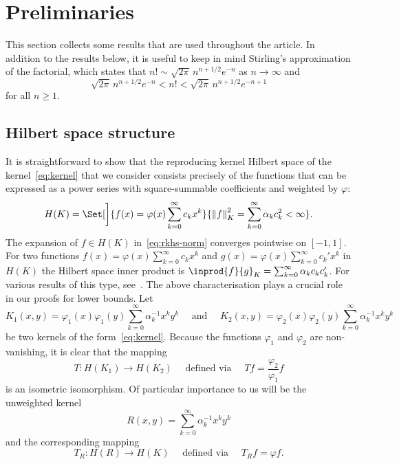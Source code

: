 \documentclass{mcom-l}
\numberwithin{equation}{section}
\numberwithin{theorem}{section} %
\begin{document}
\section{Preliminaries}

This section collects some results that are used throughout the article.
In addition to the results below, it is useful to keep in mind Stirling's approximation of the factorial, which states that $n! \sim \sqrt{2\pi} \, n^{n+1/2} e^{-n}$ as $n \to \infty$ and
\begin{equation*}
  \sqrt{2\pi} \, n^{n+1/2} e^{-n} < n! < \sqrt{2\pi} \, n^{n+1/2} e^{-n+1}
\end{equation*}
for all $n \geq 1$.

\subsection{Hilbert space structure} \label{sec:rkhs}

It is straightforward to show that the reproducing kernel Hilbert space of the kernel~\eqref{eq:kernel} that we consider consists precisely of the functions that can be expressed as a power series with square-summable coefficients and weighted by $\varphi$: 
\begin{equation} \label{eq:rkhs-norm}
  H(K) = \Set[\bigg]{ f(x) = \varphi(x) \sum_{k=0}^\infty c_k x^k }{ \norm[0]{f}_K^2 = \sum_{k=0}^\infty \alpha_k c_k^2 < \infty }.
\end{equation}
The expansion of $f \in H(K)$ in~\eqref{eq:rkhs-norm} converges pointwise on $[-1, 1]$.
For two functions $f(x) = \varphi(x) \sum_{k=0}^\infty c_k x^k$ and $g(x) = \varphi(x) \sum_{k=0}^\infty c_k' x^k$ in $H(K)$ the Hilbert space inner product is $\inprod{f}{g}_K = \sum_{k=0}^\infty \alpha_k c_k c_k'$.
For various results of this type, see~\cite{Zwicknagl2009, Minh2010, ZwicknaglSchaback2013, Gnewuch2022, Karvonen2022-sample}.
The above characterisation plays a crucial role in our proofs for lower bounds.
Let
\begin{equation*}
  K_1(x, y) = \varphi_1(x) \varphi_1(y) \sum_{k=0}^\infty \alpha_k^{-1} x^k y^k \quad \text{ and } \quad  K_2(x, y) = \varphi_2(x) \varphi_2(y) \sum_{k=0}^\infty \alpha_k^{-1} x^k y^k  
\end{equation*}
be two kernels of the form~\eqref{eq:kernel}.
Because the functions $\varphi_1$ and $\varphi_2$ are non-vanishing, it is clear that the mapping
\begin{equation*}
  T \colon H(K_1) \to H(K_2) \quad \text{ defined via } \quad T f = \frac{\varphi_2}{\varphi_1} f
\end{equation*}
is an isometric isomorphism.
Of particular importance to us will be the unweighted kernel
\begin{equation} \label{eq:K0-kernel}
  R(x, y) = \sum_{k=0}^\infty \alpha_k^{-1} x^k y^k
\end{equation}
and the corresponding mapping
\begin{equation} \label{eq:mapping-T0}
  T_R \colon H(R) \to H(K) \quad \text{ defined via } \quad T_R f = \varphi f.
\end{equation}
\end{document}
